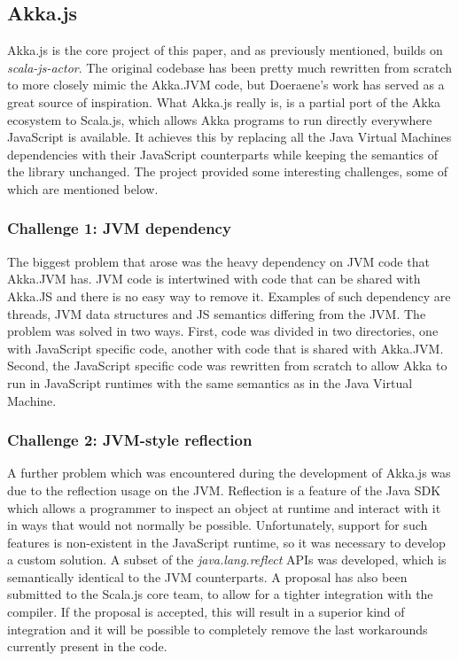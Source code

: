 \documentclass{sig-alternate}
\begin{document}
\subsection{Akka.js}

Akka.js is the core project of this paper, and as previously mentioned, builds on \textit{scala-js-actor}. The original codebase has been pretty much rewritten from scratch to more closely mimic the Akka.JVM code, but Doeraene's work has served as a great source of inspiration.
What Akka.js really is, is a partial port of the Akka ecosystem to Scala.js, which allows Akka programs to run directly everywhere JavaScript is available. It achieves this by replacing all the Java Virtual Machines dependencies with their JavaScript counterparts while keeping the semantics of the library unchanged. The project provided some interesting challenges, some of which are mentioned below.

\subsubsection{Challenge 1: JVM dependency}

The biggest problem that arose was the heavy dependency on JVM code that Akka.JVM has. JVM code is intertwined with code that can be shared with Akka.JS and there is no easy way to remove it. Examples of such dependency are threads, JVM data structures and JS semantics differing from the JVM.
The problem was solved in two ways. First, code was divided in two directories, one with JavaScript specific code, another with code that is shared with Akka.JVM. Second, the JavaScript specific code was rewritten from scratch to allow Akka to run in JavaScript runtimes with the same semantics as in the Java Virtual Machine.

\subsubsection{Challenge 2: JVM-style reflection}

A further problem which was encountered during the development of Akka.js was due to the reflection usage on the JVM. Reflection is a feature of the Java SDK which allows a programmer to inspect an object at runtime and interact with it in ways that would not normally be possible. Unfortunately, support for such features is non-existent in the JavaScript runtime, so it was necessary to develop a custom solution. A subset of the \emph{java.lang.reflect} APIs was developed, which is semantically identical to the JVM counterparts. A proposal has also been submitted to the Scala.js core team, to allow for a tighter integration with the compiler.
If the proposal is accepted, this will result in a superior kind of integration and it will be possible to completely remove the last workarounds currently present in the code.
\end{document}

